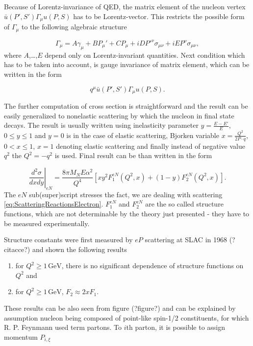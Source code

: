 \documentclass[a4paper,11pt]{report}
\newcommand{\GeV}{\,\text{GeV}}
\begin{document}
Because of Lorentz-invariance of QED, the matrix element of the nucleon vertex
$\bar{u}(P',S')\Gamma_\mu u(P,S)$ has to be Lorentz-vector. This restricts
the possible form of $\Gamma_\mu$ to the following algebraic structure

\begin{equation}
  \Gamma_\mu = A \gamma_\mu + B P_\mu' + C P_\mu + i D P'^\nu \sigma_{\mu\nu}
    + i E P^\nu \sigma_{\mu\nu},
  \label{eq:ScatteringAlgebraicMatrix}
\end{equation}
where $A$,\dots,$E$ depend only on Lorentz-invariant quantities. Next condition
which has to be taken into account, is gauge invariance of matrix element, which
can be written in the form

\begin{equation}
  q^\mu \bar{u}(P',S')\Gamma_\mu u(P,S).
  \label{eq:ScatteringGaugeInvariance}
\end{equation}

The further computation of cross section is straightforward and the result can
be easily generalized to nonelastic scattering by which the nucleon in final
state decays. The result is usually written using inelasticity parameter
$y=\frac{E-E'}{E}$, $0 \leq y \leq 1$ and $y=0$ is in the case of elastic
scattering, Bjorken variable $ x = \frac{Q^2}{2 P \cdot q}$, $ 0 < x \leq 1$, $x
= 1$ denoting elastic scattering and finally instead of negative value $q^2$ the
$Q^2 = -q^2$ is used. Final result can be than written in the form

\begin{equation}
  \left. \frac{d^2\sigma}{dxdy} \right|_{eN} =
  \frac{8 \pi M_N E \alpha^2}{Q^4} \left[ x y^2 F_1^{eN}(Q^2, x)
  + (1-y) F_2^{eN}(Q^2,x) \right].
  \label{eq:ScatteringRes1}
\end{equation}
The $eN$ sub(super)script stresses the fact, we are dealing with scattering
\eqref{eq:ScatteringReactionsElectron}. $F_1^{eN}$ and $F_2^{eN}$ are the so
called structure functions, which are not determinable by the theory just
presented - they have to be measured experimentally.

Structure constants were first measured by $eP$ scattering at SLAC in 1968
(?citacce?) and shown the following results
\begin{enumerate}
  \item for $Q^2 \geq 1\GeV$, there is no significant dependence of structure
    functions on $Q^2$ and
  \item for $Q^2 \geq 1\GeV$, $F_2 \approx 2xF_1$.
\end{enumerate}
These results can be also seen from figure (?figure?) and can be explained by
assumption nucleon being composed of point-like spin-1/2 constituents, for which
R. P. Feynmann used term partons. To $i$th parton, it is possible to assign
momentum $P_{i,\xi}$
\end{document}
